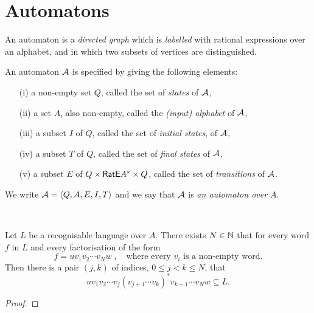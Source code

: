 \section{Automatons}

An automaton is a \emph{directed graph} which is \emph{labelled} with rational expressions over an alphabet, and in which two subsets of vertices are distinguished.

\begin{defn}
    An automaton ${\mathcal{A}}$ is specified by giving the following elements:
    \begin{itemize}
        \item[(i)] a non-empty set $Q$, called the set of \emph{states} of ${\mathcal{A}}$,
        \item[(ii)] a set $A$, also non-empty, called the \emph{(input) alphabet} of ${\mathcal{A}}$,
        \item[(iii)] a subset $I$ of $Q$, called the set of \emph{initial states}, of ${\mathcal{A}}$,
        \item[(iv)] a subset $T$ of $Q$, called the set of \emph{final states} of ${\mathcal{A}}$,
        \item[(v)] a subset $E$ of $Q \times {\mathsf{RatE}} A^* \times Q$, called the set of \emph{transitions} of ${\mathcal{A}}$.
    \end{itemize}
    We write ${\mathcal{A}} = \langle Q, A, E, I, T \rangle$ and we say that ${\mathcal{A}}$ is \emph{an automaton over $A$}.
\end{defn}

\begin{defn} \\
\end{defn}

\begin{lemma}\label{lm:block_star_lemma}
    Let $L$ be a recognisable language over $A$. There exists $N \in \mathbb{N}$ that for every word $f$ in $L$ and every factorisation of the form
    \[
        f = u v_1 v_2 \dotsm v_N w \; , \quad \text{where every $v_i$ is a non-empty word.}
    \]
    Then there is a pair $(j,k)$ of indices, $0 \leq j < k \leq N$, that
    \[
        u v_1 v_2 \dotsm v_j {(v_{j+1} \dotsm v_k)}^* v_{k+1} \dotsm v_N w \subseteq L.
    \]
\end{lemma}

\begin{proof}
\end{proof}

